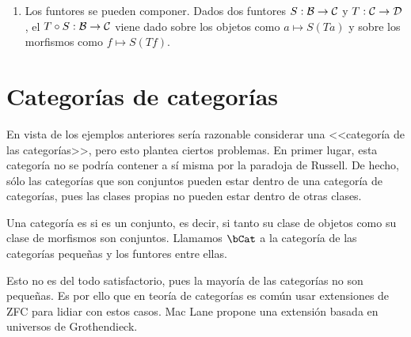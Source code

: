 \begin{example}
\begin{enumerate}
    \begin{proof}
      Primero vemos que la operación sobre morfismos está bien definida. Sea
      $f:(X,x)\to(Y,y)$ un morfismo en $\bTop_*$, y sean
      $\gamma,\sigma:[0,1]\to X$ representantes de un mismo elemento de
      $\pi(X,x)$, entonces existe una homotopía $s:[0,1]\times[0,1]\to X$ de
      $\gamma$ a $\sigma$, con lo que $f\circ s:[0,1]\times[0,1]\to Y$ es una
      homotopía de $f(\sigma)$ a $f(\gamma)$ y
      $(\pi f)(\overline{\gamma})=(\pi f)(\overline{\sigma})$.  Además $\pi f$
      es un morfismo de grupos, pues la composición con $f$ lleva la curva
      constante en $x$ a la curva constante en $y$ y respeta la concatenación de
      curvas. Finalmente, dados morfismos $f:(X,x)\to (Y,y)$ y $g:(Y,y)\to(Z,z)$
      en $\bTop_*$, es fácil ver que $\pi(g\circ f)=\pi g\circ\pi f$ y que
      $\pi(1_{(X,x)})=1_{\pi(X,x)}$.
    \end{proof}
  \item Los funtores se pueden componer. Dados dos funtores $S:\mathcal{B}\to\mathcal{C}$ y
    $T:\mathcal{C}\to\mathcal{D}$, el  $T\circ S:\mathcal{B}\to\mathcal{C}$ viene dado
    sobre los objetos como $a\mapsto S(Ta)$ y sobre los morfismos como
    $f\mapsto S(Tf)$.
  \end{enumerate}
\end{example}

\section{Categorías de categorías}

En vista de los ejemplos anteriores sería razonable considerar una <<categoría
de las categorías>>, pero esto plantea ciertos problemas. En primer lugar, esta
categoría no se podría contener a sí misma por la paradoja de Russell. De hecho,
sólo las categorías que son conjuntos pueden estar dentro de una categoría de
categorías, pues las clases propias no pueden estar dentro de otras clases.

\begin{definition}
  Una categoría es  si es un conjunto, es decir, si tanto su
  clase de objetos como su clase de morfismos son conjuntos. Llamamos $\bCat$
  a la categoría de las categorías pequeñas y los funtores entre ellas.
\end{definition}

Esto no es del todo satisfactorio, pues la mayoría de las categorías no son
pequeñas. Es por ello que en teoría de categorías es común usar extensiones de
ZFC para lidiar con estos casos. Mac Lane\cite[pp. 21--26]{maclane} propone una
extensión basada en universos de Grothendieck.

